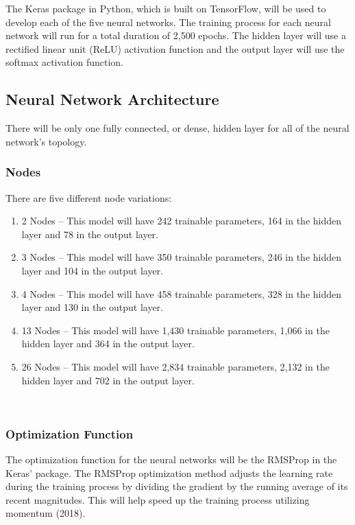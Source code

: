 \documentclass[5p,authoryear]{elsarticle}
\begin{document}
The Keras package in Python, which is built on TensorFlow, will be used to develop each of the five neural networks. 
The training process for each neural network will run for a total duration of 2,500 epochs. 
The hidden layer will use a rectified linear unit (ReLU) activation function and the output layer will use the softmax activation function.


\subsection{Neural Network Architecture}\label{arch}

There will be only one fully connected, or dense, hidden layer for all of the neural network’s topology. 

\subsubsection{Nodes}\label{corpus}


There are five different node variations: 

\begin{enumerate}
 \item 2 Nodes – This model will have 242 trainable parameters, 164 in the hidden layer and 78 in the output layer.
 \item 3 Nodes – This model will have 350 trainable parameters, 246 in the hidden layer and 104 in the output layer. 
 \item 4 Nodes – This model will have 458 trainable parameters, 328 in the hidden layer and 130 in the output layer.
 \item 13 Nodes – This model will have 1,430 trainable parameters, 1,066 in the hidden layer and 364 in the output layer.
 \item 26 Nodes – This model will have 2,834 trainable parameters, 2,132 in the hidden layer and 702 in the output layer.
\end{enumerate} \\


\subsubsection{Optimization Function}\label{opt}

The optimization function for the neural networks will be the RMSProp in the Keras’ package. The RMSProp optimization method adjusts the learning rate during the training process by dividing the gradient by the running average of its recent magnitudes. This will help speed up the training process utilizing momentum (2018). 
\end{document}
